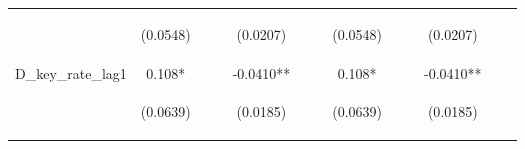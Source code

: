 \documentclass[]{article}
\begin{document}
\begin{center}
\begin{tabular}{lcccccccccccc}
\vspace{4pt} & \begin{footnotesize}(0.0548)\end{footnotesize} & \begin{footnotesize}\end{footnotesize} & \begin{footnotesize}\end{footnotesize} & \begin{footnotesize}(0.0207)\end{footnotesize} & \begin{footnotesize}\end{footnotesize} & \begin{footnotesize}\end{footnotesize} & \begin{footnotesize}(0.0548)\end{footnotesize} & \begin{footnotesize}\end{footnotesize} & \begin{footnotesize}\end{footnotesize} & \begin{footnotesize}(0.0207)\end{footnotesize} & \begin{footnotesize}\end{footnotesize} & \begin{footnotesize}\end{footnotesize} \\
D\_key\_rate\_lag1 & 0.108* &  &  & -0.0410** &  &  & 0.108* &  &  & -0.0410** &  &  \\
\vspace{4pt} & \begin{footnotesize}(0.0639)\end{footnotesize} & \begin{footnotesize}\end{footnotesize} & \begin{footnotesize}\end{footnotesize} & \begin{footnotesize}(0.0185)\end{footnotesize} & \begin{footnotesize}\end{footnotesize} & \begin{footnotesize}\end{footnotesize} & \begin{footnotesize}(0.0639)\end{footnotesize} & \begin{footnotesize}\end{footnotesize} & \begin{footnotesize}\end{footnotesize} & \begin{footnotesize}(0.0185)\end{footnotesize} & \begin{footnotesize}\end{footnotesize} & \begin{footnotesize}\end{footnotesize} \\

\end{tabular}
\end{center}
\end{document}
